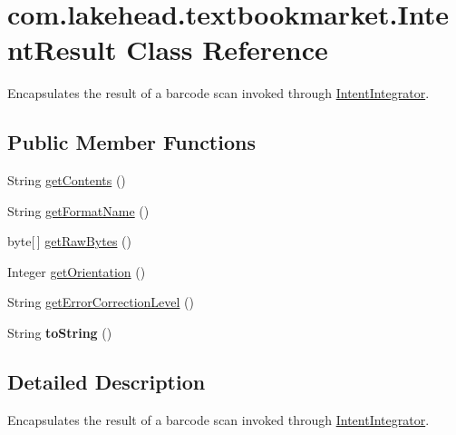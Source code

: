 \hypertarget{classcom_1_1lakehead_1_1textbookmarket_1_1_intent_result}{\section{com.\-lakehead.\-textbookmarket.\-Intent\-Result Class Reference}
\label{classcom_1_1lakehead_1_1textbookmarket_1_1_intent_result}
}


Encapsulates the result of a barcode scan invoked through \hyperlink{classcom_1_1lakehead_1_1textbookmarket_1_1_intent_integrator}{Intent\-Integrator}.  


\subsection*{Public Member Functions}
\begin{DoxyCompactItemize}
\item 
String \hyperlink{classcom_1_1lakehead_1_1textbookmarket_1_1_intent_result_aa210b538b6d7a1b8c74b7a73ec250149}{get\-Contents} ()
\item 
String \hyperlink{classcom_1_1lakehead_1_1textbookmarket_1_1_intent_result_aa11b6013b1364a417255dea971affcb1}{get\-Format\-Name} ()
\item 
byte\mbox{[}$\,$\mbox{]} \hyperlink{classcom_1_1lakehead_1_1textbookmarket_1_1_intent_result_ac96ceeb02b02fe61e282560258be4b4f}{get\-Raw\-Bytes} ()
\item 
Integer \hyperlink{classcom_1_1lakehead_1_1textbookmarket_1_1_intent_result_acad89f98b88d080e62c1e8b03bc0d131}{get\-Orientation} ()
\item 
String \hyperlink{classcom_1_1lakehead_1_1textbookmarket_1_1_intent_result_afd7b195f8e172688f59a1ce7da4fd497}{get\-Error\-Correction\-Level} ()
\item 
\hypertarget{classcom_1_1lakehead_1_1textbookmarket_1_1_intent_result_a4a1784ebcdf0bb6cbcd1b1300732e040}{String {\bfseries to\-String} ()}\label{classcom_1_1lakehead_1_1textbookmarket_1_1_intent_result_a4a1784ebcdf0bb6cbcd1b1300732e040}

\end{DoxyCompactItemize}


\subsection{Detailed Description}
Encapsulates the result of a barcode scan invoked through \hyperlink{classcom_1_1lakehead_1_1textbookmarket_1_1_intent_integrator}{Intent\-Integrator}. 

